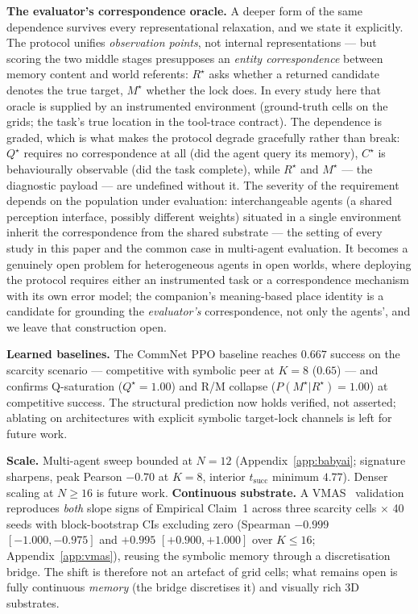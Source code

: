 \documentclass{article}
\begin{document}
\textbf{The evaluator's correspondence oracle.} A deeper form of the
same dependence survives every representational relaxation, and we
state it explicitly. The protocol unifies \emph{observation points},
not internal representations --- but scoring the two middle stages
presupposes an \emph{entity correspondence} between memory content and
world referents: $R^\star$ asks whether a returned candidate denotes
the true target, $M^\star$ whether the lock does. In every study here
that oracle is supplied by an instrumented environment (ground-truth
cells on the grids; the task's true location in the tool-trace
contract). The dependence is graded, which is what makes the protocol
degrade gracefully rather than break: $Q^\star$ requires no
correspondence at all (did the agent query its memory), $C^\star$ is
behaviourally observable (did the task complete), while $R^\star$ and
$M^\star$ --- the diagnostic payload --- are undefined
without it. The severity of the requirement depends on the population
under evaluation: interchangeable agents (a shared perception
interface, possibly different weights) situated in a single
environment inherit the correspondence from the shared substrate ---
the setting of every study in this paper and the common case in
multi-agent evaluation. It becomes a genuinely open problem for
heterogeneous agents in open worlds, where deploying the protocol
requires either an instrumented task or a correspondence mechanism
with its own error model; the companion's meaning-based place identity
is a candidate for grounding the \emph{evaluator's} correspondence,
not only the agents', and we leave that construction open.

\textbf{Learned baselines.} The CommNet PPO baseline reaches $0.667$ success on the scarcity scenario --- competitive with symbolic peer at $K{=}8$ ($0.65$) --- and confirms Q-saturation ($Q^\star{=}1.00$) and R/M collapse ($P(M^\star|R^\star){=}1.00$) at competitive success. The structural prediction now holds verified, not asserted; ablating on architectures with explicit symbolic target-lock channels is left for future work.

\textbf{Scale.} Multi-agent sweep bounded at $N{=}12$ (Appendix~\ref{app:babyai}; signature sharpens, peak Pearson $-0.70$ at $K{=}8$, interior $t_{\mathrm{succ}}$ minimum $4.77$). Denser scaling at $N{\ge}16$ is future work.
\textbf{Continuous substrate.} A VMAS~\citep{bettini2022vmas} validation reproduces \emph{both} slope signs of Empirical Claim~1 across three scarcity cells $\times$ 40 seeds with block-bootstrap CIs excluding zero (Spearman $-0.999$ $[-1.000,-0.975]$ and $+0.995$ $[+0.900,+1.000]$ over $K{\le}16$; Appendix~\ref{app:vmas}), reusing the symbolic memory through a discretisation bridge. The shift is therefore not an artefact of grid cells; what remains open is fully continuous \emph{memory} (the bridge discretises it) and visually rich 3D substrates.
\end{document}
